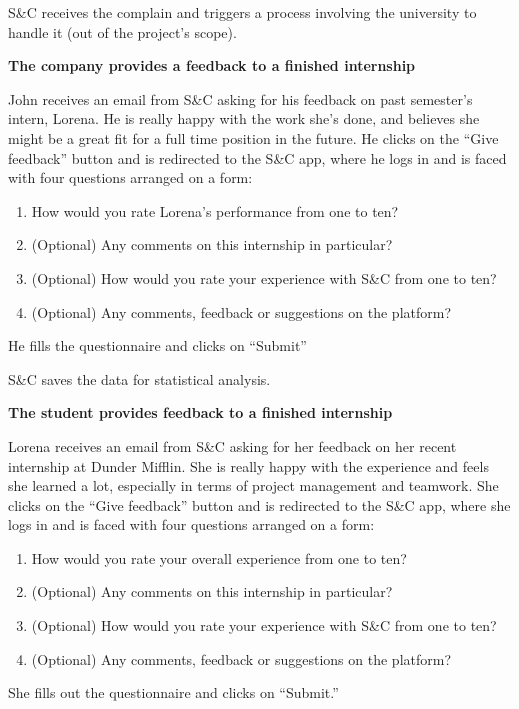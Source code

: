 S\&C receives the complain and triggers a process involving the university to handle it (out of the project’s scope).

\textbf{The company provides a feedback to a finished internship}

John receives an email from S\&C asking for his feedback on past semester’s intern, Lorena. He is really happy with the work she’s done, and believes she might be a great fit for a full time position in the future. He clicks on the “Give feedback” button and is redirected to the S\&C app, where he logs in and is faced with four questions arranged on a form:

\begin{enumerate}
    \item How would you rate Lorena’s performance from one to ten?
    \item (Optional) Any comments on this internship in particular?
    \item (Optional) How would you rate your experience with S\&C from one to ten?
    \item (Optional) Any comments, feedback or suggestions on the platform?
\end{enumerate}

He fills the questionnaire and clicks on “Submit”

S\&C saves the data for statistical analysis.
 

\textbf{The student provides feedback to a finished internship}

Lorena receives an email from S\&C asking for her feedback on her recent internship at Dunder Mifflin. She is really happy with the experience and feels she learned a lot, especially in terms of project management and teamwork. She clicks on the “Give feedback” button and is redirected to the S\&C app, where she logs in and is faced with four questions arranged on a form:

\begin{enumerate}
    \item How would you rate your overall experience from one to ten?
    \item (Optional) Any comments on this internship in particular?
    \item (Optional) How would you rate your experience with S\&C from one to ten?
    \item (Optional) Any comments, feedback or suggestions on the platform?
\end{enumerate}

She fills out the questionnaire and clicks on “Submit.”

